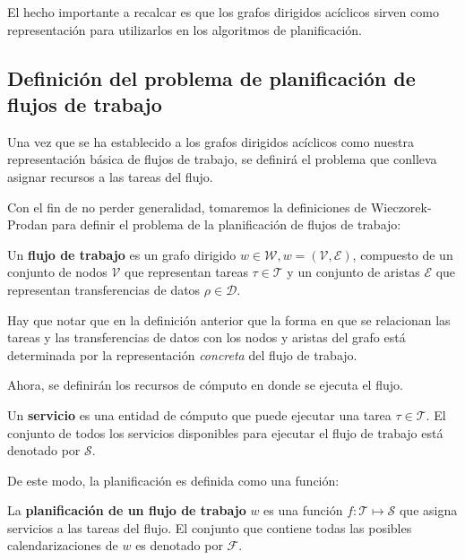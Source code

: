 El hecho importante a recalcar es que los grafos dirigidos acíclicos sirven como representación para utilizarlos en los algoritmos de planificación.


\subsection{Definición del problema de planificación de flujos de trabajo}
Una vez que se ha establecido a los grafos dirigidos acíclicos como nuestra representación básica de flujos de trabajo, se definirá el problema que conlleva asignar recursos a las tareas del flujo.

Con el fin de no perder generalidad, tomaremos la definiciones de Wieczorek-Prodan \cite{wieczorek2008taxonomies} para definir el problema de la planificación de flujos de trabajo:

\begin{defn}
Un \textbf{flujo de trabajo} es un grafo dirigido $w \in \mathcal{W}, w = (\mathcal{V},\mathcal{E})$, compuesto de un conjunto de nodos $\mathcal{V}$ que representan tareas $ \tau \in \mathcal{T}$ y un conjunto de aristas $\mathcal{E}$ que representan transferencias de datos $ \rho \in \mathcal{D}$.
\end{defn}

Hay que notar que en la definición anterior que la forma en que se relacionan las tareas y las transferencias de datos con los nodos y aristas del grafo está determinada por la representación \emph{concreta} del flujo de trabajo.

Ahora, se definirán los recursos de cómputo en donde se ejecuta el flujo. 

\begin{defn}
Un \textbf{servicio} es una entidad de cómputo que puede ejecutar una tarea $\tau \in \mathcal{T}$. El conjunto de todos los servicios disponibles para ejecutar el flujo de trabajo está denotado por $\mathcal{S}$.
\end{defn}

De este modo, la planificación es definida como una función:

\begin{defn}
La \textbf{planificación de un flujo de trabajo} $w$ es una función $ f: \mathcal{T} \mapsto \mathcal{S}$ que asigna servicios a las tareas del flujo. El conjunto que contiene todas las posibles calendarizaciones de $w$ es denotado por $\mathcal{F}$.
\end{defn}

